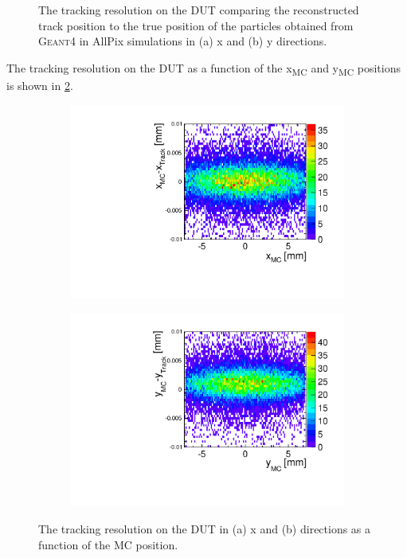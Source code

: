 \begin{figure}[htbp]
\begin{subfigure}[b]{0.45\textwidth}
    \caption{}
  \end{subfigure}
  \caption{The tracking resolution on the DUT comparing the
    reconstructed track position to the true position of the particles
    obtained from \textsc{Geant4} in AllPix simulations in (a) x and
    (b) y directions.}
  \label{fig:DUT_MC_track}
\end{figure}


The tracking resolution on the DUT as a function of the
x\textsubscript{MC} and y\textsubscript{MC} positions is shown in
\cref{fig:DUT_MC_track_2D}.

\begin{figure}[htbp] \centering
  \begin{subfigure}[b]{0.45\textwidth}
    \includegraphics[width=\textwidth]{figures/Telescope/Unbiased_trackRes_DUT_x_2D.pdf}
    \caption{}
  \end{subfigure}\hfill
  \begin{subfigure}[b]{0.45\textwidth}
    \includegraphics[width=\textwidth]{figures/Telescope/Unbiased_trackRes_DUT_y_2D.pdf}
    \caption{}
  \end{subfigure}
  \caption{The tracking resolution on the DUT in (a) x and (b)
    directions as a function of the MC position.}
  \label{fig:DUT_MC_track_2D}
\end{figure}



